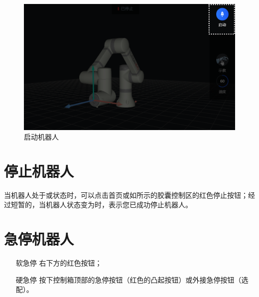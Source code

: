 \begin{figure}[ht]
	\centering
	\includegraphics[width=\textwidth]{image/07/图2.17 启动机器人.png}
	\caption{启动机器人}
	\label{fig:启动机器人}
\end{figure}

\section{停止机器人}
当机器人处于或状态时，可以点击首页或如所示的胶囊控制区的红色停止按钮；经过短暂的，当机器人状态变为时，表示您已成功停止机器人。


\section{急停机器人}

\begin{itemize}[leftmargin=3.5em]
	\item[软急停] \LM 右下方的红色按钮；
	\item[硬急停] 按下控制箱顶部的急停按钮（红色的凸起按钮）或外接急停按钮（选配）。
\end{itemize}


